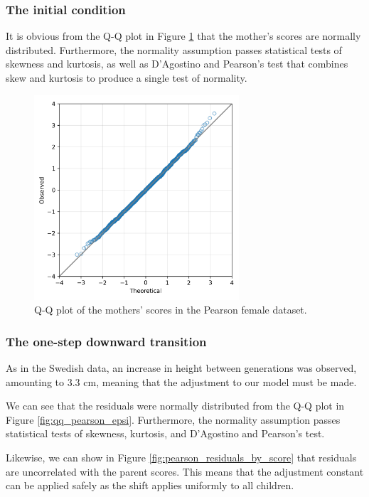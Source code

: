 \documentclass[a4paper,11pt]{article} %
\begin{document}
\subsubsection*{The initial condition}

It is obvious from the Q-Q plot in Figure \ref{fig:qq_pearson_x} that the mother's scores are normally distributed. Furthermore, the normality assumption passes statistical tests of skewness and kurtosis, as well as D’Agostino and Pearson's test that combines skew and kurtosis to produce a single test of normality.

\begin{figure}[h]
\includegraphics[width=3in]{figures/pearson-lee-mother-daughter-qq_parents.png}
\centering
\caption{Q-Q plot of the mothers' scores in the Pearson female dataset.}
\label{fig:qq_pearson_x}
\end{figure}


\subsubsection*{The one-step downward transition}

As in the Swedish data, an increase in height between generations was observed, amounting to 3.3 cm, meaning that the adjustment to our model must be made. 

We can see that the residuals were normally distributed from the Q-Q plot in Figure \ref{fig:qq_pearson_epsi}. Furthermore, the normality assumption passes statistical tests of skewness, kurtosis, and D’Agostino and Pearson's test.

Likewise, we can show in Figure \ref{fig:pearson_residuals_by_score} that residuals are uncorrelated with the parent scores. This means that the adjustment constant can be applied safely as the shift applies uniformly to all children. 
\end{document}
